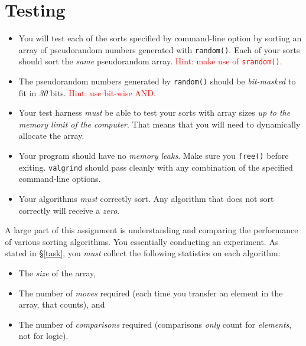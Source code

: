 \section{Testing}

\begin{itemize}
  \item You will test each of the sorts specified by command-line option
    by sorting an array of pseudorandom numbers generated with
    \texttt{random()}. Each of your sorts should sort the \emph{same}
    pseudorandom array. \textcolor{red}{Hint: make use of
    \texttt{srandom()}.}
  \item The pseudorandom numbers generated by \texttt{random()} should
    be \emph{bit-masked} to fit in \emph{30} bits. \textcolor{red}{Hint: use
    bit-wise AND.}
  \item Your test harness \emph{must} be able to test your sorts with
    array sizes \emph{up to the memory limit of the computer}. That
    means that you will need to dynamically allocate the array.
  \item Your program should have no \emph{memory leaks}. Make sure you
    \texttt{free()} before exiting. \texttt{valgrind} should pass
    cleanly with any combination of the specified command-line options.
  \item Your algorithms \emph{must} correctly sort. Any algorithm that
    does not sort correctly will receive a \emph{zero}.
\end{itemize}

A large part of this assignment is understanding and comparing the
performance of various sorting algorithms. You essentially conducting an
experiment. As stated in \S\ref{task}, you \emph{must} collect the following
statistics on each algorithm:

\begin{itemize}
  \item The \emph{size} of the array,
  \item The number of \emph{moves} required (each time you transfer an
    element in the array, that counts), and
  \item The number of \emph{comparisons} required (comparisons
    \emph{only} count for \emph{elements}, not for logic).
\end{itemize}
